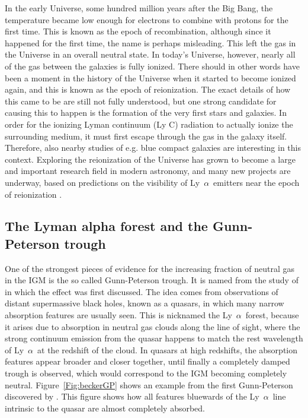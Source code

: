 \documentclass[a4wide,12pt]{book}
\newcommand{\lya}{Ly~${\alpha}$}
\begin{document}
{In the early Universe, some hundred million years after the Big Bang, the temperature became low enough for electrons to combine with protons for the first time. This is known as the epoch of recombination, although since it happened for the first time, the name is perhaps misleading. This left the gas in the Universe in an overall neutral state. In today's Universe, however, nearly all of the gas between the galaxies is fully ionized. There should in other words have been a moment in the history of the Universe when it started to become ionized again, and this is known as the epoch of reionization. The exact details of how this came to be are still not fully understood, but one strong candidate for causing this to happen is the formation of the very first stars and galaxies. In order for the ionizing Lyman continuum (Ly C) radiation to actually ionize the surrounding medium, it must first escape through the gas in the galaxy itself. Therefore, also nearby studies of e.g. blue compact galaxies \citep[like the Ly C leakage from Haro 11, see][]{leitet-2011} are interesting in this context. Exploring the reionization of the Universe has grown to become a large and important research field in modern astronomy, and many new projects are underway, based on predictions on the visibility of \lya\ emitters near the epoch of reionization \citep[e.g.][]{dayal-2011,jensen-2012}.

\subsection{The Lyman alpha forest and the Gunn-Peterson trough}

One of the strongest pieces of evidence for the increasing fraction of neutral gas in the IGM is the so called Gunn-Peterson trough. It is named from the study of \citet{gunn-peterson1965} in which the effect was first discussed. The idea comes from observations of distant supermassive black holes, known as a quasars, in which many narrow absorption features are usually seen. This is nicknamed the \lya\ forest, because it arises due to absorption in neutral gas clouds along the line of sight, where the strong continuum emission from the quasar happens to match the rest wavelength of \lya\ at the redshift of the cloud. In quasars at high redshifts, the absorption features appear broader and closer together, until finally a completely damped trough is observed, which would correspond to the IGM becoming completely neutral. Figure~\ref{Fig:beckerGP} shows an example from the first Gunn-Peterson discovered by \citet{becker-2001}. This figure shows how all features bluewards of the \lya\ line intrinsic to the quasar are almost completely absorbed. 

}
\end{document}
